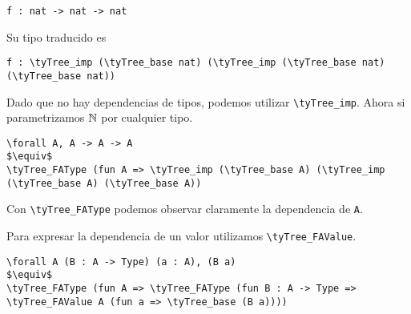 \begin{lstlisting}
f : nat -> nat -> nat
\end{lstlisting}

Su tipo traducido es

\begin{lstlisting}
f : \tyTree_imp (\tyTree_base nat) (\tyTree_imp (\tyTree_base nat) (\tyTree_base nat))
\end{lstlisting}

Dado que no hay dependencias de tipos, podemos utilizar \lstinline{\tyTree_imp}. Ahora si parametrizamos
$\mathbb{N}$ por cualquier tipo.

\begin{lstlisting}
\forall A, A -> A -> A
$\equiv$
\tyTree_FAType (fun A => \tyTree_imp (\tyTree_base A) (\tyTree_imp (\tyTree_base A) (\tyTree_base A))
\end{lstlisting}

Con \lstinline{\tyTree_FAType} podemos observar claramente la dependencia de \lstinline{A}.

Para expresar la dependencia de un valor utilizamos \lstinline{\tyTree_FAValue}.

\begin{lstlisting}
\forall A (B : A -> Type) (a : A), (B a)
$\equiv$
\tyTree_FAType (fun A => \tyTree_FAType (fun B : A -> Type => \tyTree_FAValue A (fun a => \tyTree_base (B a))))
\end{lstlisting}

